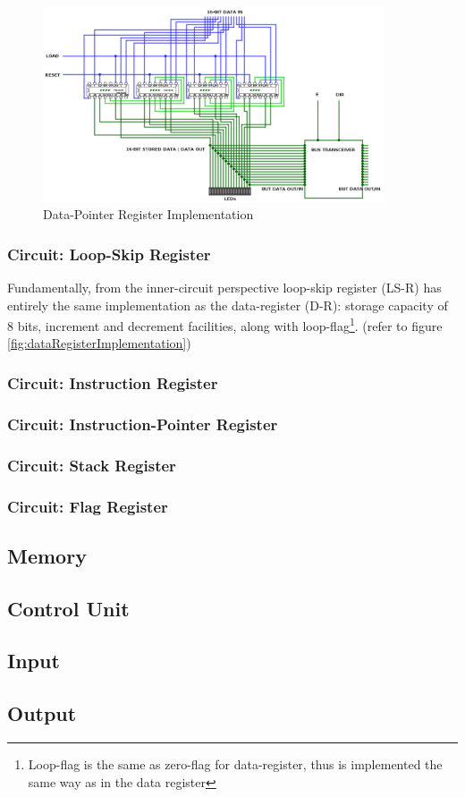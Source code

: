 \begin{figure}[H]
	\centering
	\includegraphics[width=0.9\textwidth]{img/data_pointer_register_implementation}
	\caption{Data-Pointer Register Implementation}
	\label{fig:dataPointerRegisterImplementation}
\end{figure}

\subsubsection{Circuit: Loop-Skip Register} \label{sec:implementation:registers:loop_skip}
Fundamentally, from the inner-circuit perspective loop-skip register (LS-R) has entirely the same implementation as the data-register (D-R): storage capacity of 8 bits, increment and decrement facilities, along with loop-flag\footnote{Loop-flag is the same as zero-flag for data-register, thus is implemented the same way as in the data register}. (refer to figure \ref{fig:dataRegisterImplementation})

\subsubsection{Circuit: Instruction Register}

\subsubsection{Circuit: Instruction-Pointer Register}

\subsubsection{Circuit: Stack Register}

\subsubsection{Circuit: Flag Register}



\subsection{Memory}
\subsection{Control Unit}
\subsection{Input}
\subsection{Output}

